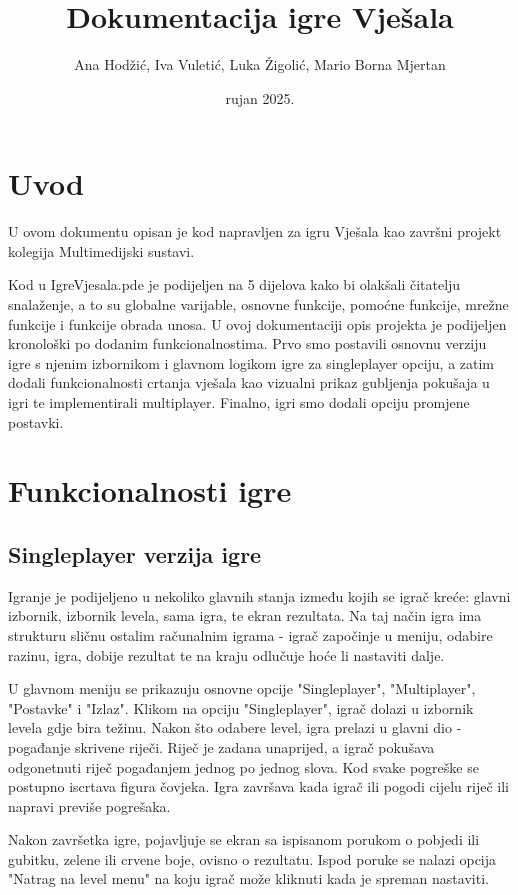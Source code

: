 \documentclass{article}
\title{Dokumentacija igre Vješala}
\author{Ana Hodžić, Iva Vuletić, Luka Žigolić, Mario Borna Mjertan}
\date{rujan 2025.}
\begin{document}
\maketitle

\section{Uvod}

U ovom dokumentu opisan je kod napravljen za igru Vješala kao završni projekt kolegija Multimedijski sustavi. 

Kod u IgreVjesala.pde je podijeljen na 5 dijelova kako bi olakšali čitatelju snalaženje, a to su globalne varijable, osnovne funkcije, pomoćne funkcije, mrežne funkcije i funkcije obrada unosa. U ovoj dokumentaciji opis projekta je podijeljen kronološki po dodanim funkcionalnostima. Prvo smo postavili osnovnu verziju igre s njenim izbornikom i glavnom logikom igre za singleplayer opciju, a zatim dodali funkcionalnosti crtanja vješala kao vizualni prikaz gubljenja pokušaja u igri te implementirali multiplayer. Finalno, igri smo dodali opciju promjene postavki.


\section{Funkcionalnosti igre}

\subsection{Singleplayer verzija igre}
Igranje je podijeljeno u nekoliko glavnih stanja između kojih se igrač kreće: glavni izbornik, izbornik levela, sama igra, te ekran rezultata. Na taj način igra ima strukturu sličnu ostalim računalnim igrama - igrač započinje u meniju, odabire razinu, igra, dobije rezultat te na kraju odlučuje hoće li nastaviti dalje.

U glavnom meniju se prikazuju osnovne opcije "Singleplayer", "Multiplayer", "Postavke" i "Izlaz". Klikom na opciju "Singleplayer", igrač dolazi u izbornik levela gdje bira težinu. Nakon što odabere level, igra prelazi u glavni dio - pogađanje skrivene riječi. Riječ je zadana unaprijed, a igrač pokušava odgonetnuti riječ pogađanjem jednog po jednog slova. Kod svake pogreške se postupno iscrtava figura čovjeka. Igra završava kada igrač ili pogodi cijelu riječ ili napravi previše pogrešaka. 

Nakon završetka igre, pojavljuje se ekran sa ispisanom porukom o pobjedi ili gubitku, zelene ili crvene boje, ovisno o rezultatu. Ispod poruke se nalazi opcija "Natrag na level menu" na koju igrač može kliknuti kada je spreman nastaviti. 
\end{document}
